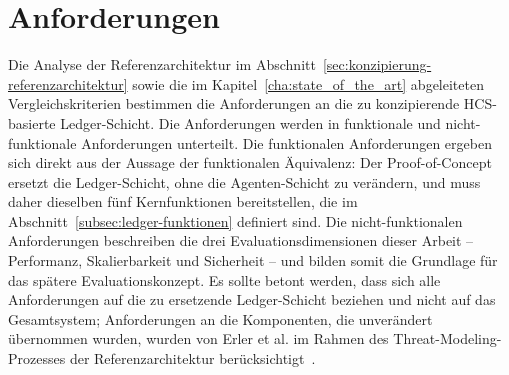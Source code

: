 \section{Anforderungen}
\label{sec:konzipierung-anforderungen}
Die Analyse der Referenzarchitektur im Abschnitt~\ref{sec:konzipierung-referenzarchitektur} sowie die im Kapitel~\ref{cha:state_of_the_art} abgeleiteten Vergleichskriterien bestimmen die Anforderungen an die zu konzipierende HCS-basierte Ledger-Schicht. Die Anforderungen werden in funktionale und nicht-funktionale Anforderungen unterteilt. Die funktionalen Anforderungen ergeben sich direkt aus der Aussage der funktionalen Äquivalenz: Der Proof-of-Concept ersetzt die Ledger-Schicht, ohne die Agenten-Schicht zu verändern, und muss daher dieselben fünf Kernfunktionen bereitstellen, die im Abschnitt~\ref{subsec:ledger-funktionen} definiert sind. Die nicht-funktionalen Anforderungen beschreiben die drei Evaluationsdimensionen dieser Arbeit -- Performanz, Skalierbarkeit und Sicherheit -- und bilden somit die Grundlage für das spätere Evaluationskonzept. Es sollte betont werden, dass sich alle Anforderungen auf die zu ersetzende Ledger-Schicht beziehen und nicht auf das Gesamtsystem; Anforderungen an die Komponenten, die unverändert übernommen wurden, wurden von Erler et al. im Rahmen des Threat-Modeling-Prozesses der Referenzarchitektur berücksichtigt~\cite{erler2023}.


